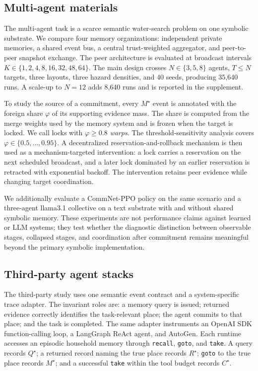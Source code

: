 \documentclass{article}
\newcommand{\method}[1]{\texttt{#1}}
\begin{document}
\subsection{Multi-agent materials}

The multi-agent task is a scarce semantic water-search problem on one symbolic substrate. We compare four memory organizations: independent private memories, a shared event bus, a central trust-weighted aggregator, and peer-to-peer snapshot exchange. The peer architecture is evaluated at broadcast intervals $K\in\{1,2,4,8,16,32,48,64\}$. The main design crosses $N\in\{3,5,8\}$ agents, $T\leq N$ targets, three layouts, three hazard densities, and 40 seeds, producing 35{,}640 runs. A scale-up to $N=12$ adds 8{,}640 runs and is reported in the supplement.

To study the source of a commitment, every $M^\star$ event is annotated with the foreign share $\varphi$ of its supporting evidence mass. The share is computed from the merge weights used by the memory system and is frozen when the target is locked. We call locks with $\varphi\geq0.8$ \emph{warps}. The threshold-sensitivity analysis covers $\varphi\in\{0.5,\ldots,0.95\}$. A decentralized reservation-and-rollback mechanism is then used as a mechanism-targeted intervention: a lock carries a reservation on the next scheduled broadcast, and a later lock dominated by an earlier reservation is retracted with exponential backoff. The intervention retains peer evidence while changing target coordination.

We additionally evaluate a CommNet-PPO policy on the same scenario and a three-agent llama3.1 collective on a text substrate with and without shared symbolic memory. These experiments are not performance claims against learned or LLM systems; they test whether the diagnostic distinction between observable stages, collapsed stages, and coordination after commitment remains meaningful beyond the primary symbolic implementation.

\subsection{Third-party agent stacks}

The third-party study uses one semantic event contract and a system-specific trace adapter. The invariant roles are: a memory query is issued; returned evidence correctly identifies the task-relevant place; the agent commits to that place; and the task is completed. The same adapter instruments an OpenAI SDK function-calling loop, a LangGraph ReAct agent, and AutoGen. Each runtime accesses an episodic household memory through \method{recall}, \method{goto}, and \method{take}. A query records $Q^\star$; a returned record naming the true place records $R^\star$; \method{goto} to the true place records $M^\star$; and a successful \method{take} within the tool budget records $C^\star$.
\end{document}
